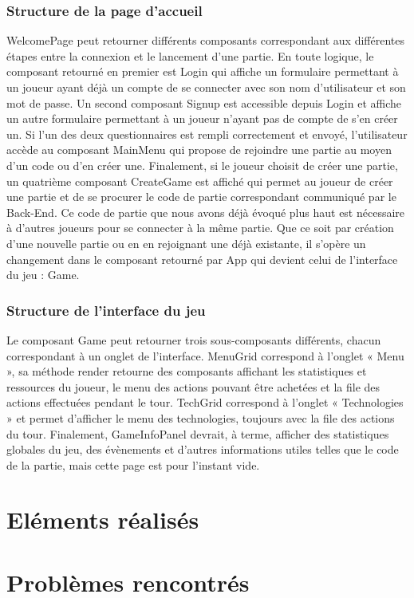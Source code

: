 \documentclass[12pt,twoside,a4paper]{article}
\begin{document}
\subsubsection{Structure de la page d’accueil}
WelcomePage peut retourner différents composants correspondant aux différentes étapes entre la connexion et le lancement d’une partie. 
En toute logique, le composant retourné en premier est Login qui affiche un formulaire permettant à un joueur ayant déjà un compte de se connecter avec son nom d’utilisateur et son mot de passe. 
Un second composant Signup est accessible depuis Login et affiche un autre formulaire permettant à un joueur n’ayant pas de compte de s’en créer un. 
Si l’un des deux questionnaires est rempli correctement et envoyé, l’utilisateur accède au composant MainMenu qui propose de rejoindre une partie au moyen d’un code ou d’en créer une. 
Finalement, si le joueur choisit de créer une partie, un quatrième composant CreateGame est affiché qui permet au joueur de créer une partie et de se procurer le code de partie correspondant communiqué par le Back-End. Ce code de partie que nous avons déjà évoqué plus haut est nécessaire à d’autres joueurs pour se connecter à la même partie.
Que ce soit par création d’une nouvelle partie ou en en rejoignant une déjà existante, il s’opère un changement dans le composant retourné par App qui devient celui de l’interface du jeu : Game.

\subsubsection{Structure de l’interface du jeu}
Le composant Game peut retourner trois sous-composants différents, chacun correspondant à un onglet de l’interface.
MenuGrid correspond à l’onglet « Menu », sa méthode render retourne des composants affichant les statistiques et ressources du joueur, le menu des actions pouvant être achetées et la file des actions effectuées pendant le tour. 
TechGrid correspond à l’onglet « Technologies » et permet d’afficher le menu des technologies, toujours avec la file des actions du tour.
Finalement, GameInfoPanel devrait, à terme, afficher des statistiques globales du jeu, des évènements et d’autres informations utiles telles que le code de la partie, mais cette page est pour l’instant vide.

\section{El\'ements r\'ealis\'es}

\section{Probl\`emes rencontr\'es}
\end{document}
